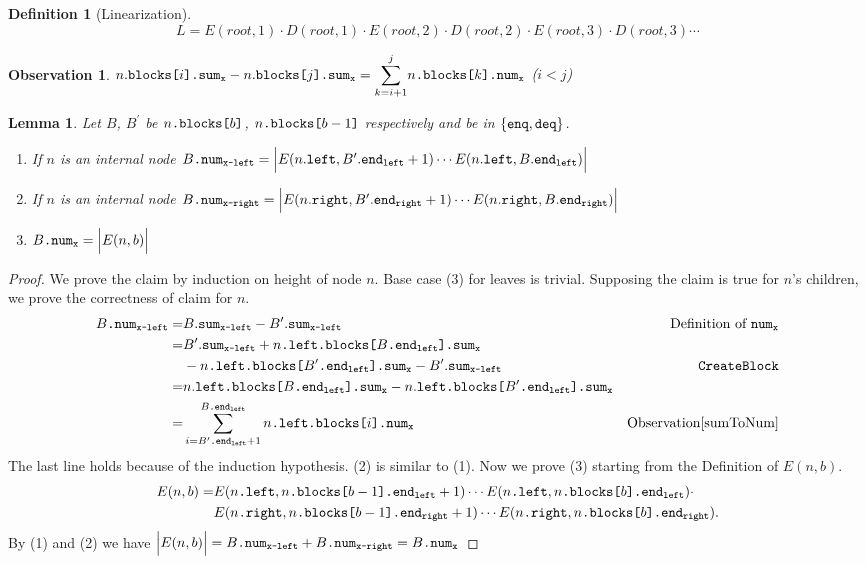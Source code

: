 \documentclass[10pt]{article}
\newcommand{\sub}[1]{\textsubscript{#1}}
\newcommand{\nf}[1]{{\normalfont{\texttt{#1}}}}
\newtheorem{lemma}[theorem]{Lemma}
\newtheorem{observation}[theorem]{Observation}
\theoremstyle{definition}
\newtheorem{definition}[theorem]{Definition}
\begin{document}
\begin{definition}[Linearization] \label{def::lin}
 $$L=E(root,1)\cdot D(root,1)\cdot E(root,2)\cdot D(root,2)\cdot E(root,3)\cdot D(root,3)\cdots$$
\end{definition}

\begin{observation}\label{sumToNum}
$n.\nf{blocks[}i\nf{].sum\sub{x}}-n.\nf{blocks[}j\nf{].sum\sub{x}}=\mathlarger{\sum}_{k=i+1}^{j}  n\nf{.blocks[}k\nf{].num\sub{x}}$ ($i<j$)
\end{observation}

\begin{lemma}\label{lem::numX}
Let $B$, $B^\prime$ be $n\nf{.blocks[}b\nf{]}$, $n\nf{.blocks[}b-1\nf{]}$ respectively and \nf{x} be in $\{\nf{enq},\nf{deq}\}$.
\begin{enumerate}[label=(\arabic*)]
    \item If $n$ is an internal node $B\nf{.num\sub{x-left}}=\Big|E(n.\nf{left},B^\prime.\nf{end\sub{left}}+1)\cdots E(n.\nf{left},B.\nf{end\sub{left}})\Big|$
    \item If $n$ is an internal node $B\nf{.num\sub{x-right}}=\Big|E(n.\nf{right},B^\prime.\nf{end\sub{right}}+1)\cdots E(n.\nf{right},B.\nf{end\sub{right}})\Big|$
    \item $B\nf{.num\sub{x}}=\Big|E(n,b)\Big|$
\end{enumerate}
\end{lemma}
\begin{proof}
 We prove the claim by induction on height of node $n$. Base case (3) for leaves is trivial. Supposing the claim is true for $n$'s children, we prove the correctness of claim for $n$.
\begin{align*}
    B\nf{.num\sub{x-left}}=&B.\nf{sum\sub{x-left}}-B^\prime.\nf{sum\sub{x-left}}& \text{Definition of }\nf{num\sub{x}}\\
    =&B^\prime.\nf{sum\sub{x-left}}+n\nf{.left.blocks[}B\nf{.end\sub{left}].sum\sub{x}}\\&-n\nf{.left.blocks[}B^\prime\nf{.end\sub{left}].sum\sub{x}}-B^\prime.\nf{sum\sub{x-left}} & \nf{CreateBlock}\\
    =& n.\nf{left.blocks[}B\nf{.end\sub{left}].sum\sub{x}}- n.\nf{left.blocks[}B^\prime\nf{.end\sub{left}].sum\sub{x}}\\
    =&\sum_{i=B^\prime\nf{.end\sub{left}}+1}^{B\nf{.end\sub{left}}}  n\nf{.left.blocks[}i\nf{].num\sub{x}} &\text{Observation} \ref{sumToNum}
\end{align*}
The last line holds because of the induction hypothesis. (2) is similar to (1). Now we prove (3) starting from the Definition of $E(n,b)$.
\begin{align*} 
E(n,b) =&  E(n\nf{.left},n\nf{.blocks[}b-1\nf{].end\sub{left}}+1)\cdots E(n\nf{.left},n\nf{.blocks[}b\nf{].end\sub{left}})\cdot \\ 
&E(n\nf{.right},n\nf{.blocks[}b-1\nf{].end\sub{right}}+1)\cdots E(n\nf{.right},n\nf{.blocks[}b\nf{].end\sub{right}}).
\end{align*}
By (1) and (2) we have $\Big|E(n,b)\Big|=B\nf{.num\sub{x-left}}+B\nf{.num\sub{x-right}}=B\nf{.num\sub{x}}$
\end{proof}
\end{document}
